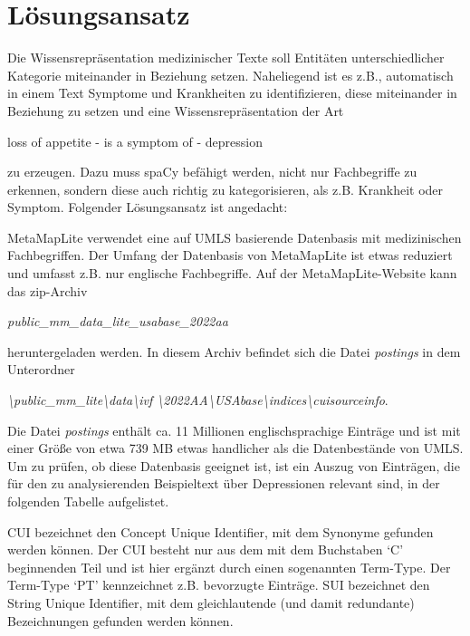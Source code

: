 \section{Lösungsansatz}

Die Wissensrepräsentation medizinischer Texte soll Entitäten unterschiedlicher Kategorie miteinander in Beziehung setzen. Naheliegend ist es z.B., automatisch in einem Text Symptome und Krankheiten zu identifizieren, diese miteinander in Beziehung zu setzen und eine Wissensrepräsentation der Art

\begin{center}
loss of appetite - is a symptom of - depression
\end{center}

zu erzeugen. Dazu muss spaCy befähigt werden, nicht nur Fachbegriffe zu erkennen, sondern diese auch richtig zu kategorisieren, als z.B. Krankheit oder Symptom. Folgender Lösungsansatz ist angedacht:

MetaMapLite verwendet eine auf UMLS basierende Datenbasis mit medizinischen Fachbegriffen. Der Umfang der Datenbasis von MetaMapLite ist etwas reduziert und umfasst z.B. nur englische Fachbegriffe. Auf der MetaMapLite-Website kann das zip-Archiv

\begin{center}
\emph{public\_mm\_data\_lite\_usabase\_2022aa}
\end{center}

heruntergeladen werden. In diesem Archiv befindet sich die Datei \emph{postings} in dem Unterordner

\begin{center}
\emph{\textbackslash public\_mm\_lite\textbackslash data\textbackslash ivf \textbackslash 2022AA\textbackslash USAbase\textbackslash indices\textbackslash cuisourceinfo}.
\end{center}

Die Datei \emph{postings} enthält ca. 11 Millionen englischsprachige Einträge und ist mit einer Größe von etwa 739 MB etwas handlicher als die Datenbestände von UMLS. Um zu prüfen, ob diese Datenbasis geeignet ist, ist ein Auszug von Einträgen, die für den zu analysierenden Beispieltext über Depressionen relevant sind, in der folgenden Tabelle aufgelistet.

CUI bezeichnet den Concept Unique Identifier, mit dem Synonyme gefunden werden können. Der CUI besteht nur aus dem mit dem Buchstaben `C' beginnenden Teil und ist hier ergänzt durch einen sogenannten Term-Type. Der Term-Type `PT' kennzeichnet z.B. bevorzugte Einträge. SUI bezeichnet den String Unique Identifier, mit dem gleichlautende (und damit redundante) Bezeichnungen gefunden werden können.

